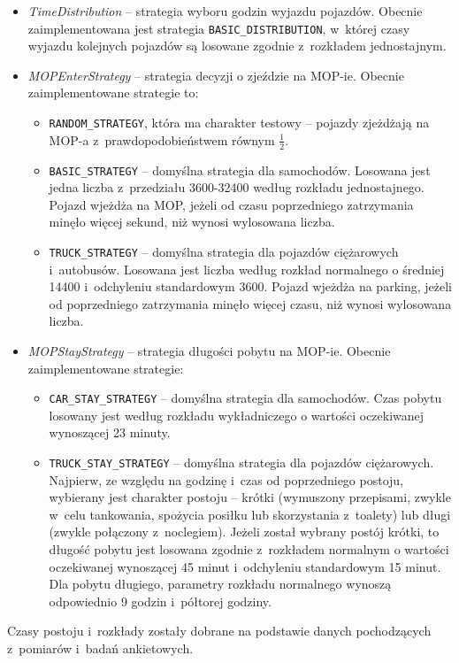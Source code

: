 \begin{itemize}
\item \textit{TimeDistribution} -- strategia wyboru godzin wyjazdu pojazdów. Obecnie zaimplementowana jest strategia \texttt{BASIC\_DISTRIBUTION}, w~której czasy wyjazdu kolejnych pojazdów są losowane zgodnie z~rozkładem jednostajnym.
\item \textit{MOPEnterStrategy} -- strategia decyzji o zjeździe na MOP-ie. Obecnie zaimplementowane strategie to:
\begin{itemize}
    \item \texttt{RANDOM\_STRATEGY}, która ma charakter testowy -- pojazdy zjeżdżają na MOP-a z~prawdopodobieństwem równym $\frac{1}{2}$.
    \item \texttt{BASIC\_STRATEGY} -- domyślna strategia dla samochodów. Losowana jest jedna liczba z~przedziału 3600-32400 według rozkładu jednostajnego. Pojazd wjeżdża na MOP, jeżeli od czasu poprzedniego zatrzymania minęło więcej sekund, niż wynosi wylosowana liczba.
    \item \texttt{TRUCK\_STRATEGY} -- domyślna strategia dla pojazdów ciężarowych i~autobusów. Losowana jest liczba według rozkład normalnego o średniej 14400 i~odchyleniu standardowym 3600.  Pojazd wjeżdża na parking, jeżeli od poprzedniego zatrzymania minęło więcej czasu, niż wynosi wylosowana liczba.
\end{itemize}
\item \textit{MOPStayStrategy} -- strategia długości pobytu na MOP-ie. Obecnie zaimplementowane strategie:
\begin{itemize}
    \item \texttt{CAR\_STAY\_STRATEGY} -- domyślna strategia dla samochodów. Czas pobytu losowany jest według rozkładu wykładniczego o wartości oczekiwanej wynoszącej 23 minuty.
    \item \texttt{TRUCK\_STAY\_STRATEGY} -- domyślna strategia dla pojazdów ciężarowych. Najpierw, ze względu na godzinę i~czas od poprzedniego postoju, wybierany jest charakter postoju -- krótki (wymuszony przepisami, zwykle w~celu tankowania, spożycia posiłku lub skorzystania z~toalety) lub długi (zwykle połączony z~noclegiem). Jeżeli został wybrany postój krótki, to długość pobytu jest losowana zgodnie z~rozkładem normalnym o wartości oczekiwanej wynoszącej 45 minut i~odchyleniu standardowym 15 minut. Dla pobytu długiego, parametry rozkładu normalnego wynoszą odpowiednio 9 godzin i~półtorej godziny.
\end{itemize}
\end{itemize}
Czasy postoju i~rozkłady zostały dobrane na podstawie danych pochodzących z~pomiarów i~badań ankietowych.

